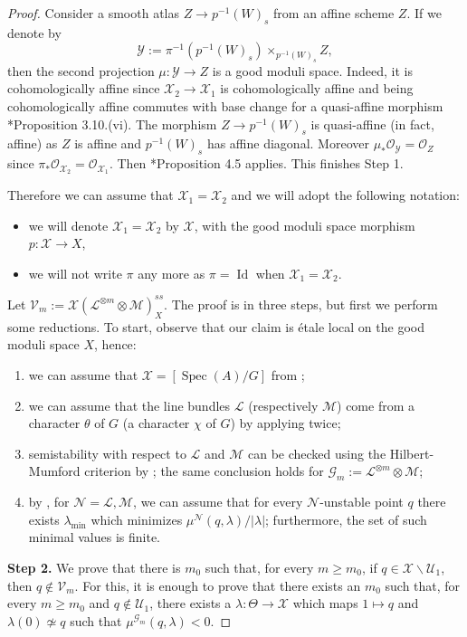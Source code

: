 \documentclass{amsart}
\newcommand{\cG}{\mathcal{G}}
\newcommand{\cL}{\mathcal{L}}
\newcommand{\cM}{\mathcal{M}}
\newcommand{\cN}{\mathcal{N}}
\newcommand{\cO}{\mathcal{O}}
\newcommand{\cU}{\mathcal{U}}
\newcommand{\cV}{\mathcal{V}}
\newcommand{\cX}{\mathcal{X}}
\newcommand{\cY}{\mathcal{Y}}
\newcommand{\spec}{\operatorname{Spec}}
\newcommand{\Id}{\operatorname{Id}}
\theoremstyle{definition}
\theoremstyle{definition}
\begin{document}
{\begin{proof}
Consider a smooth atlas $Z\to p^{-1}(W)_s$ from an affine scheme $Z$. If we denote by \[\cY:=\pi^{-1}(p^{-1}(W)_s)\times_{p^{-1}(W)_s}Z,\] then the second projection $\mu:\cY\to Z$ is a good moduli space. Indeed, it is cohomologically affine since $\cX_2\to \cX_1$ is cohomologically affine and being cohomologically affine commutes with base change for a quasi-affine morphism \cite{Alp}*{Proposition 3.10.(vi)}. The morphism $Z\to p^{-1}(W)_s$ is quasi-affine (in fact, affine) as $Z$ is affine and $p^{-1}(W)_s$ has affine diagonal. Moreover $\mu_*\cO_\cY=\cO_{Z}$ since $\pi_*\cO_{\cX_2}=\cO_{\cX_1}$. Then \cite{Alp}*{Proposition 4.5} applies. This finishes Step 1. 
\color{black}

Therefore we can assume that $\cX_1=\cX_2$ and we will adopt the following notation:
\begin{itemize}
    \item we will denote $\cX_1=\cX_2$ by $\cX$, with the good moduli space morphism $p:\cX\to X$,
    \item we will not write $\pi$ any more as $\pi=\Id$ when $\cX_1=\cX_2$.
\end{itemize}


Let $\cV_m:=\cX(\cL^{\otimes m}\otimes \cM)^{ss}_{X}$.  The proof is in three steps, but first we perform some reductions. To start, observe that our claim is \'etale local on the good moduli space $X$, hence:
\begin{enumerate}
    \item we can assume that $\cX=[\spec(A)/G]$ from \cite{AHREtale};
    \item we can assume that the line bundles $\cL$ (respectively $\cM$) come from a character $\theta$ of $G$ (a character $\chi$ of $G$) by applying  twice;
    \item semistability with respect to $\cL$ and $\cM$ can be checked using the Hilbert-Mumford criterion by ; the same conclusion holds for $\cG_m := \cL^{\otimes m}\otimes \cM$;
    \item by , for $\cN=\cL, \cM$, we can assume that for every $\cN$-unstable point $q$ there exists $\lambda_{\min}$ which minimizes $\mu^{\cN}(q,\lambda)/|\lambda|$; furthermore, the set of such minimal values is finite.
\end{enumerate}
\textbf{Step 2.} We prove that there is $m_0$ such that, for every $m\ge m_0$, if $q\in \cX\smallsetminus \cU_1$, then $q\notin \cV_m$. 
For this, it is enough to prove that there exists an $m_0$ such that, for every $m\geq m_0$ and $q\notin \cU_1$, there exists a $\lambda\colon\Theta\to\cX$ which maps $1\mapsto q$ and $\lambda(0)\not\simeq q$ such that  $\mu^{\cG_m}(q,\lambda) < 0$. 


\end{proof}}
\end{document}
